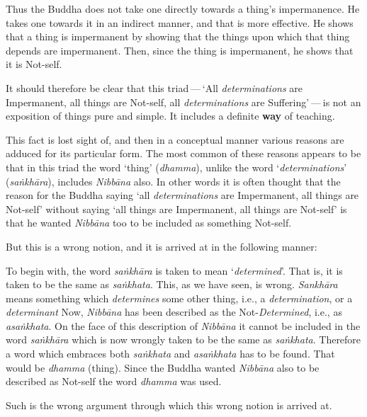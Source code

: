 Thus the Buddha does not take one directly towards a thing's impermanence. He takes one towards it in an indirect manner, and that is more effective. He shows that a thing is impermanent by showing that the things upon which that thing depends are impermanent. Then, since the thing is impermanent, he shows that it is Not-self.

It should therefore be clear that this triad --- `All \emph{determinations} are Impermanent, all things are Not-self, all \emph{determinations} are Suffering' --- is not an exposition of things pure and simple. It includes a definite \textbf{way} of teaching.

This fact is lost sight of, and then in a conceptual manner various reasons are adduced for its particular form. The most common of these reasons appears to be that in this triad the word `thing' (\emph{dhamma}), unlike the word `\emph{determinations}' (\emph{saṅkhāra}), includes \emph{Nibbāna} also. In other words it is often thought that the reason for the Buddha saying `all \emph{determinations} are Impermanent, all things are Not-self' without saying `all things are Impermanent, all things are Not-self' is that he wanted \emph{Nibbāna} too to be included as something Not-self.

But this is a wrong notion, and it is arrived at in the following manner:

To begin with, the word \emph{saṅkhāra} is taken to mean `\emph{determined}'. That is, it is taken to be the same as \emph{saṅkhata}. This, as we have seen, is wrong. \emph{Sankhāra} means something which \emph{determines} some other thing, i.e., a \emph{determination}, or a \emph{determinant} Now, \emph{Nibbāna} has been described as the Not-\emph{Determined}, i.e., as \emph{asaṅkhata}. On the face of this description of \emph{Nibbāna} it cannot be included in the word \emph{saṅkhāra} which is now wrongly taken to be the same as \emph{saṅkhata}. Therefore a word which embraces both \emph{saṅkhata} and \emph{asaṅkhata} has to be found. That would be \emph{dhamma} (thing). Since the Buddha wanted \emph{Nibbāna} also to be described as Not-self the word \emph{dhamma} was used.

Such is the wrong argument through which this wrong notion is arrived at.


